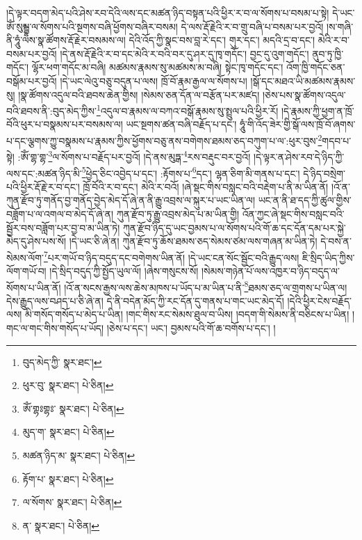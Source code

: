 །དེ་ལྟར་བདག་མེད་པའི་ཤེས་རབ་དེའི་ལས་དང་མཚན་ཉིད་བསྟན་པའི་ཕྱིར་ར་བ་ལ་སོགས་པ་བསམ་པ་སྟེ། དེ་ཡང་ཨོཾ་སུམྦྷ་ལ་སོགས་པའི་སྔགས་བཞི་ཕྱོགས་བཞིར་བསམ། དེ་ལས་རྡོ་རྗེའི་ར་བ་གྲུ་བཞི་པ་བསམ་པར་བྱའོ། །ས་གཞི་ནི་ཧཱུཾ་ལས་སྣ་ཚོགས་རྡོ་རྗེར་བསམས་ལ། དེའི་འོད་ཀྱི་སྣང་བས་བླ་རེ་དང་། གུར་དང་། མདའི་དྲ་བ་དང་། མེའི་ར་བ་བསམ་པར་བྱའོ། །དེ་ནས་རྡོ་རྗེའི་ར་བ་དང་མེའི་ར་བའི་བར་དུ་ཤར་དུ་ཁྭ་གདོང་། བྱང་དུ་འུག་གདོང་། ནུབ་ཏུ་ཁྱི་གདོང་། ལྷོར་ཕག་གདོང་མ་བཞི། མཚམས་རྣམས་སུ་མཚམས་མ་བཞི། སྟེང་ཁྭ་གདོང་དང་། འོག་ཁྱི་གདོང་ཅན་བསྒོམ་པར་བྱའོ། །དེ་ཡང་ལེའུ་བཅུ་བདུན་པ་ལས། ཁྲོ་བོ་རྣམ་རྒྱལ་ལ་སོགས་པ། །སྒོ་དང་མཐའ་ཡི་མཚམས་རྣམས་སུ། །སྣ་ཚོགས་འདུལ་བའི་ཐབས་ཆེན་གྱིས། །སེམས་ཅན་དོན་ལ་བརྩོན་པར་མཛད། །ཅེས་པས་སྣ་ཚོགས་འདུལ་བའི་ཐབས་ནི་:བུད་མེད་ཀྱིས་\footnote{བུད་མེད་ཀྱི་  སྣར་ཐང་། }འདུལ་བ་རྣམས་ལ་བཀའ་བསྒོ་རྣམས་སུ་སྤྲུལ་པའི་ཕྱིར་རོ། །དེ་རྣམས་ཀྱི་ཕྱག་ན་ཁྲོ་བོའི་ཕུར་པ་བསྣམས་པར་བསམས་ལ། ཡང་སྔགས་ཚན་བཞི་བརྗོད་པ་དང་། ཧཱུཾ་གི་འོད་ཟེར་གྱི་སྒོ་ལས་ཁྲོ་བོ་ཞགས་པ་དང་ལྕགས་ཀྱུ་བསྣམས་པ་རྣམས་ཀྱིས་ཕྱོགས་བཅུ་ནས་བགེགས་ཐམས་ཅད་བཀུག་པ་ལ་:ཕུར་བུས་\footnote{ཕུར་བུ་  སྣར་ཐང་།  པེ་ཅིན། }གདབ་པ་སྟེ། :ཨོཾ་གྷ་གྷ་\footnote{ཨོཾ་གྷཿགྷཿ་  སྣར་ཐང་།  པེ་ཅིན། }ལ་སོགས་པ་བརྗོད་པར་བྱའོ། །དེ་ནས་མུཏྒ་\footnote{མུད་ག་  སྣར་ཐང་།  པེ་ཅིན། }རས་བརྡུང་བར་བྱའོ། །དེ་ལྟར་ན་ཤེས་རབ་དེ་ཉིད་ཀྱི་ལས་དང་:མཚན་ཉིད་མི་\footnote{མཚན་ཉིད་མ་  སྣར་ཐང་།  པེ་ཅིན། }ཕྱེད་ཅིང་འབྱེད་པ་དང་། :རྟོགས་པ་\footnote{རྟོག་པ་  སྣར་ཐང་།  པེ་ཅིན། }དང་། ལྷན་ཅིག་མི་གནས་པ་དང་། དེ་ཉིད་བསྲེག་པའི་ཕྱིར་རྡོ་རྗེ་ར་བ་དང་། ཁྲོ་བོའི་ར་བ་དང་། མེའི་ར་བའོ། །ཞེ་སྡང་གིས་བསླང་བའི་བརྡེག་པ་ནི་མ་ཡིན་ནོ། །འོ་ན་ཀུན་རྫོབ་ཏུ་གནོད་བྱ་གནོད་བྱེད་མེད་དོ་ཞེ་ན་ནི་རྒྱུ་འབྲས་ལ་སྐུར་པ་ཡང་ཡིན་ལ། ཡང་ན་ནི་ཐ་དད་ཀྱི་ཚུལ་གྱིས་བཟློག་པ་ལ་འགལ་བ་མེད་དོ་ཞེ་ན། ཀུན་རྫོབ་ཏུ་རྒྱུ་འབྲས་མེད་པ་མ་ཡིན་གྱི། འོན་ཀྱང་ཞེ་སྡང་གིས་བསླང་བའི་སྦྱོར་བས་བཟློག་པར་བྱ་བ་མ་ཡིན་ཏེ། ཀུན་རྫོབ་ཉིད་དུ་ཡང་བྱམས་པ་ལ་སོགས་པའི་གོ་ཆ་དང་དོན་དམ་པར་སྐྱེ་མེད་དུ་ཤེས་པས་སོ། །དེ་ཡང་ཅི་ཞེ་ན། ཀུན་རྫོབ་ཏུ་ཆོས་ཐམས་ཅད་སེམས་ཙམ་ལས་གཞན་མ་ཡིན་ཏེ། དེ་བས་ན་སེམས་ལོག་\footnote{ལ་སོགས་  སྣར་ཐང་།  པེ་ཅིན། }པར་གཡོ་བ་ཉིད་བདུད་དང་བགེགས་ཡིན་ནོ། །དེ་ཡང་ངན་སོང་སྦྱོང་བའི་རྒྱུད་ལས། ཇི་སྲིད་ཡིད་ཀྱིས་ལོག་གཡོ་བ། །དེ་སྲིད་བདུད་ཀྱི་སྤྱོད་ཡུལ་ལོ། །ཞེས་གསུངས་སོ། །སེམས་གཉེན་པོ་ལས་འཁྱར་བ་ཉིད་བདུད་ལ་སོགས་པ་ཡིན་ནོ། །འོ་ན་སངས་རྒྱས་ལས་ཆེས་མཁས་པ་ཡོད་པ་མ་ཡིན་པ་ནི་\footnote{ན་  སྣར་ཐང་།  པེ་ཅིན། }ཐམས་ཅད་ལ་གྲགས་པ་ཡིན་ལ། དེས་རྒྱུད་ལས་བཤད་པ་ཅི་ཞེ་ན། དེ་ནི་བདེན་མོད་ཀྱི་རང་དོན་དུ་གནས་པ་གང་ཡང་མེད་དོ། །དེའི་ཕྱིར་ངེས་བརྗོད་ལས། མི་གསོད་གསོད་པ་མེད་པ་ཡིན། །གང་གིས་རང་སེམས་ཐུལ་བ་ཡིས། །བདག་གི་སེམས་ནི་བཅིངས་པ་ཡིན། །གང་ལ་གང་གིས་གསོད་པ་ཡོད། །ཅེས་པ་དང་། ཡང་། བྱམས་པའི་གོ་ཆ་བགོས་པ་དང་། །

